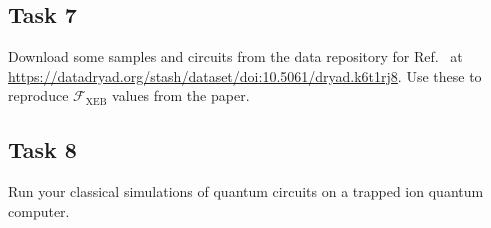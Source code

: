 \documentclass[12pt]{article}
\begin{document}
\subsection*{Task 7}

Download some samples and circuits from the data repository for Ref.~ at \url{https://datadryad.org/stash/dataset/doi:10.5061/dryad.k6t1rj8}.
Use these to reproduce $\mathcal{F}_\mathrm{XEB}$ values from the paper.


\subsection*{Task 8}

Run your classical simulations of quantum circuits on a trapped ion quantum computer.




\end{document}
